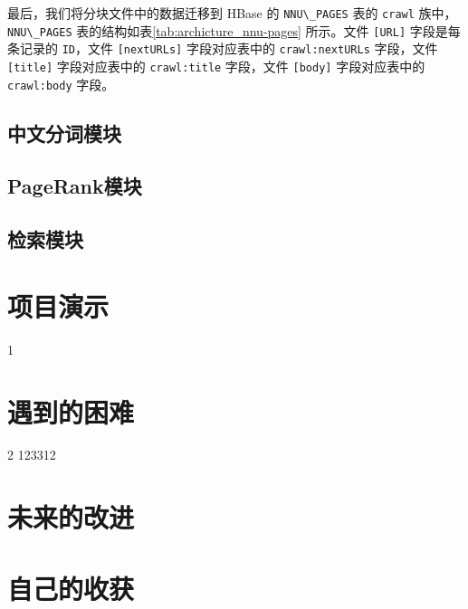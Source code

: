 \documentclass{ctexart}
\newcommand{\code}[1]{\colorbox{backcolor}{\lstinline|#1|}}
\begin{document}
    最后，我们将分块文件中的数据迁移到 HBase 的 \code{NNU\_PAGES} 表的 \code{crawl} 族中，\code{NNU\_PAGES} 表的结构如表\ref{tab:archicture_nnu-pages} 所示。文件 \code{[URL]} 字段是每条记录的 \code{ID}，文件 \code{[nextURLs]} 字段对应表中的 \code{crawl:nextURLs} 字段，文件 \code{[title]} 字段对应表中的 \code{crawl:title} 字段，文件 \code{[body]} 字段对应表中的 \code{crawl:body} 字段。

    \subsection{中文分词模块}\label{subsec:segment}

    \subsection{PageRank模块}\label{subsec:pagerank}

    \subsection{检索模块}\label{subsec:retrieve}


    \section{项目演示}\label{sec:demo}
    1


    \section{遇到的困难}\label{sec:difficulty}

    2\cite{pascal} 123312\cite{search-engine}


    \section{未来的改进}\label{sec:improvement}


    \section{自己的收获}\label{sec:achievement}

    
    
\end{document}
